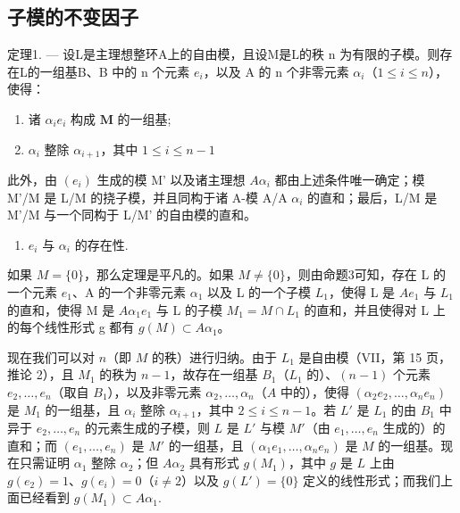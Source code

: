 \subsection{子模的不变因子}

定理1. --- 设L是主理想整环A上的自由模，且设M是L的秩 n 为有限的子模。则存在L的一组基B、B 中的 n 个元素 \(e_{i}\)，以及 A 的 n 个非零元素 \(\alpha_{i}\)（\(1 \leqslant i \leqslant n\)），使得：

\begin{enumerate}
\def\labelenumi{\alph{enumi})}
\item
  诸 \(\alpha_{i}e_{i}\) 构成 \(\mathbf{M}\) 的一组基;
\item
  \(\alpha_{i}\) 整除 \(\alpha_{i + 1}\)，其中 \(1\leqslant i\leqslant n - 1\)
\end{enumerate}

此外，由 \((e_{i})\) 生成的模 M' 以及诸主理想 \(A\alpha_{i}\) 都由上述条件唯一确定；模 M'/M 是 L/M 的挠子模，并且同构于诸 A-模 A/A \(\alpha_{i}\) 的直和；最后，L/M 是 M'/M 与一个同构于 L/M' 的自由模的直和。

\begin{enumerate}
\def\labelenumi{\arabic{enumi})}
\tightlist
\item
  \(e_i\) 与 \(\alpha_i\) 的存在性.
\end{enumerate}

如果 \(M = \{0\}\)，那么定理是平凡的。如果 \(M \neq \{0\}\)，则由命题3可知，存在 L 的一个元素 \(e_{1}\)、A 的一个非零元素 \(\alpha_{1}\) 以及 L 的一个子模 \(L_{1}\)，使得 L 是 \(Ae_{1}\) 与 \(L_{1}\) 的直和，使得 M 是 \(A\alpha_{1}e_{1}\) 与 L 的子模 \(M_{1} = M \cap L_{1}\) 的直和，并且使得对 L 上的每个线性形式 g 都有 \(g(M) \subset A\alpha_{1}\)。

现在我们可以对 \(n\)（即 \(M\) 的秩）进行归纳。由于 \(L_1\) 是自由模（VII，第 15 页，推论 2），且 \(M_1\) 的秩为 \(n - 1\)，故存在一组基 \(B_1\)（\(L_1\) 的）、\((n - 1)\) 个元素 \(e_2, \ldots, e_n\)（取自 \(B_1\)），以及非零元素 \(\alpha_2, \ldots, \alpha_n\)（\(A\) 中的），使得 \((\alpha_2e_2, \ldots, \alpha_ne_n)\) 是 \(M_1\) 的一组基，且 \(\alpha_i\) 整除 \(\alpha_{i+1}\)，其中 \(2 \leqslant i \leqslant n - 1\)。若 \(L'\) 是 \(L_1\) 的由 \(B_1\) 中异于 \(e_2, \ldots, e_n\) 的元素生成的子模，则 \(L\) 是 \(L'\) 与模 \(M'\)（由 \(e_1, \ldots, e_n\) 生成的）的直和；而 \((e_1, \ldots, e_n)\) 是 \(M'\) 的一组基，且 \((\alpha_1e_1, \ldots, \alpha_ne_n)\) 是 \(M\) 的一组基。现在只需证明 \(\alpha_1\) 整除 \(\alpha_2\)；但 \(A\alpha_2\) 具有形式 \(g(M_1)\)，其中 \(g\) 是 \(L\) 上由 \(g(e_2) = 1\)、\(g(e_i) = 0\)（\(i \neq 2\)）以及 \(g(L') = \{0\}\) 定义的线性形式；而我们上面已经看到 \(g(M_1) \subset A\alpha_1\).

